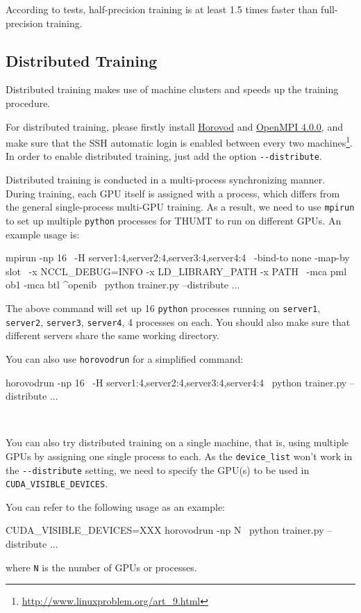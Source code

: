 \documentclass{article}
\begin{document}
According to tests, half-precision training is at least 1.5 times faster than full-precision training.

\subsection{Distributed Training}

Distributed training makes use of machine clusters and speeds up the training procedure.

For distributed training, please firstly install \href{https://github.com/horovod/horovod}{Horovod} and \href{https://www.open-mpi.org/software/ompi/v4.0/}{OpenMPI 4.0.0}, and make sure that the SSH automatic login is enabled between every two machines\footnote{\url{http://www.linuxproblem.org/art_9.html}}. In order to enable distributed training, just add the option \verb|--distribute|.

Distributed training is conducted in a multi-process synchronizing manner. During training, each GPU itself is assigned with a process, which differs from the general single-process multi-GPU training. As a result, we need to use \verb|mpirun| to set up multiple \verb|python| processes for THUMT to run on different GPUs. An example usage is:
\begin{everbatim}
mpirun -np 16 \
-H server1:4,server2:4,server3:4,server4:4 \
-bind-to none -map-by slot \
-x NCCL_DEBUG=INFO -x LD_LIBRARY_PATH -x PATH \
-mca pml ob1 -mca btl ^openib \
python trainer.py --distribute ...
\end{everbatim}

The above command will set up 16 \verb|python| processes running on \verb|server1|, \verb|server2|, \verb|server3|, \verb|server4|, 4 processes on each. You should also make sure that different servers share the same working directory. 

You can also use \verb|horovodrun| for a simplified command:
\begin{everbatim}
horovodrun -np 16 \
-H server1:4,server2:4,server3:4,server4:4 \
python trainer.py --distribute ...
\end{everbatim}

\

You can also try distributed training on a single machine, that is, using multiple GPUs by assigning one single process to each. As the \verb|device_list| won't work in the \verb|--distribute| setting, we need to specify the GPU(s) to be used in \verb|CUDA_VISIBLE_DEVICES|. 

You can refer to the following usage as an example:
\begin{everbatim}
CUDA_VISIBLE_DEVICES=XXX horovodrun -np N \
python trainer.py --distribute ...
\end{everbatim}
where \verb|N| is the number of GPUs or processes.
\end{document}
